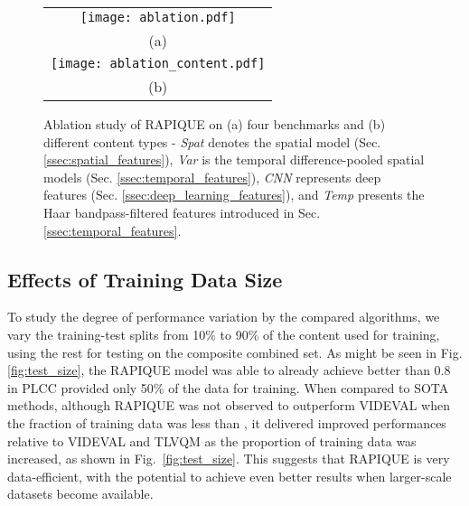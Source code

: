 \documentclass[transmag]{IEEEtran}
\begin{document}
\begin{figure}[!t]
\centering
\footnotesize
\begin{tabular}{c}
     \texttt{[image: ablation.pdf]}  \\
     (a)
     \\
     \texttt{[image: ablation\_content.pdf]} \\
     (b) 
     \\
\end{tabular}

\caption{Ablation study of RAPIQUE on (a) four benchmarks and (b) different content types - \textit{Spat} denotes the spatial model (Sec. \ref{ssec:spatial_features}), \textit{Var} is the temporal difference-pooled spatial models (Sec. \ref{ssec:temporal_features}), \textit{CNN} represents deep features (Sec. \ref{ssec:deep_learning_features}), and \textit{Temp} presents the Haar bandpass-filtered features introduced in Sec. \ref{ssec:temporal_features}.}
\label{fig:ablation}
\end{figure}

\subsection{Effects of Training Data Size}
\label{ssec:training_size}

To study the degree of performance variation by the compared algorithms, we vary the training-test splits from 10\% to 90\% of the content used for training, using the rest for testing on the composite combined set. As might be seen in Fig. \ref{fig:test_size}, the RAPIQUE model was able to already achieve better than 0.8 in PLCC provided only 50\% of the data for training. When compared to SOTA methods, although RAPIQUE was not observed to outperform VIDEVAL when the fraction of training data was less than , it delivered improved performances relative to VIDEVAL and TLVQM as the proportion of training data was increased, as shown in Fig.~\ref{fig:test_size}. This suggests that RAPIQUE is very data-efficient, with the potential to achieve even better results when larger-scale datasets become available.
\end{document}
